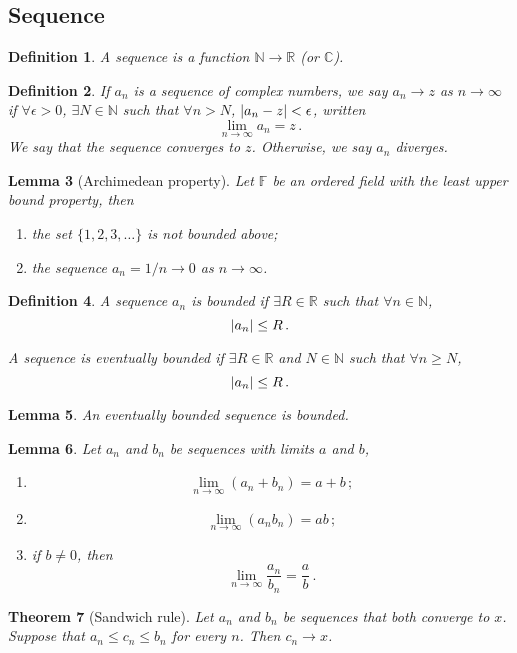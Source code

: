 \documentclass{article}
\theoremstyle{plain}\theoremheaderfont{\normalfont\itshape}\theorembodyfont{\rmfamily}\theoremseparator{.}\newtheorem*{rem}{Remark}\newtheorem*{ex}{Example}\newtheorem*{proof}{Proof}\newtheorem*{altp}{Alternative proof}
\theoremstyle{plain}\theoremheaderfont{\normalfont\bfseries}\theorembodyfont{\rmfamily}\theoremseparator{.}\newtheorem{thm}{Theorem}[section]\newtheorem{lem}[thm]{Lemma}\newtheorem{prop}[thm]{Proposition}\newtheorem*{cor}{Corollary}\newtheorem{defn}[thm]{Definition}\newtheorem{clm}[thm]{Claim}\newtheorem{clminproof}{Claim}
\theoremstyle{break}\theoremheaderfont{\normalfont\itshape}\theorembodyfont{\rmfamily}\theoremseparator{.\medskip}\newtheorem*{proofskip}{Proof}\newtheorem*{exs}{Examples}\newtheorem*{rems}{Remarks}
\theoremstyle{break}\theoremheaderfont{\normalfont\bfseries}\theorembodyfont{\rmfamily}\theoremseparator{.\medskip}\newtheorem{lemskip}[thm]{Lemma}\newtheorem{defnskip}[thm]{Definition}\newtheorem{propskip}[thm]{Proposition}\newtheorem{thmskip}[thm]{Theorem}
\begin{document}
    \subsection{Sequence}
    \begin{defn}
        A \textit{sequence} is a function \(\mathbb{N}\to \mathbb{R}\) (or \(\mathbb{C}\)).
    \end{defn}
    \begin{defn}
        If \(a_n\) is a sequence of complex numbers, we say \(a_n\to z\) as \(n\to\infty\) if \(\forall\epsilon>0\), \(\exists N\in\mathbb{N}\) such that \(\forall n>N\), \(\abs{a_n-z}<\epsilon\), written
        \[\lim_{n\to\infty}a_n=z\,.\]
        We say that the sequence \textit{converges} to \(z\). Otherwise, we say \(a_n\) \textit{diverges}.
    \end{defn}
    \begin{lem}[Archimedean property]
        Let \(\mathbb{F}\) be an ordered field with the least upper bound property, then
        \begin{enumerate}[topsep=0pt,label=(\roman*)]
            \item the set \(\{1,2,3,\dots\}\) is not bounded above;
            \item the sequence \(a_n=1/n\to 0\) as \(n\to \infty\).
        \end{enumerate}
    \end{lem}
    \begin{defn}
        A sequence \(a_n\) is \textit{bounded} if \(\exists R\in\mathbb{R}\) such that \(\forall n\in\mathbb{N}\),
        \[\abs{a_n}\le R\,.\]

        A sequence is \textit{eventually bounded} if \(\exists R\in\mathbb{R}\) and \(N\in\mathbb{N}\) such that \(\forall n\ge N\),
        \[\abs{a_n}\le R\,.\]
    \end{defn}
    \begin{lem}
        An eventually bounded sequence is bounded.
    \end{lem}
    \begin{lem}
        Let \(a_n\) and \(b_n\) be sequences with limits \(a\) and \(b\),
        \begin{enumerate}[topsep=0pt,label=(\roman*)]
            \item \[\lim_{n\to\infty}(a_n+b_n)= a+b\,;\]
            \item \[\lim_{n\to\infty}(a_nb_n)= ab\,;\]
            \item if \(b\ne 0\), then
            \[\lim_{n\to\infty}\frac{a_n}{b_n}=\frac{a}{b}\,.\]
        \end{enumerate}
    \end{lem}
    \begin{thm}[Sandwich rule]
        Let \(a_n\) and \(b_n\) be sequences that both converge to \(x\). Suppose that \(a_n\le c_n\le b_n\) for every \(n\). Then \(c_n\to x\).
    \end{thm}
\end{document}
